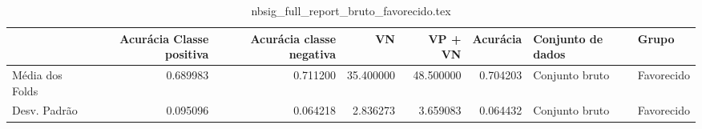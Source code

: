 \begin{table}
\centering
\caption{nbsig_full_report_bruto_favorecido.tex}
\label{nbsig_full_report_bruto_favorecido.tex}
\begin{tabular}{lrrrrrll}
\toprule
{} &  Acurácia Classe positiva &  Acurácia classe negativa &        VN  &   VP + VN  &  Acurácia & Conjunto de dados &       Grupo \\
\midrule
Média dos Folds &                  0.689983 &                  0.711200 &  35.400000 &  48.500000 &  0.704203 &    Conjunto bruto &  Favorecido \\
Desv. Padrão    &                  0.095096 &                  0.064218 &   2.836273 &   3.659083 &  0.064432 &    Conjunto bruto &  Favorecido \\
\bottomrule
\end{tabular}
\end{table}
